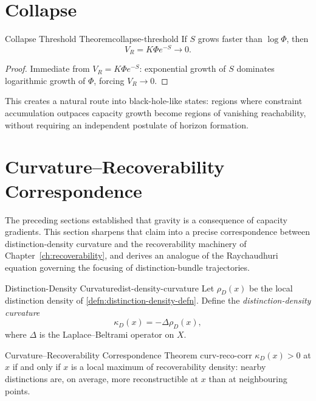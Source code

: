 \documentclass[12pt,twoside,openright]{book}
\begin{document}
\section{Collapse}
\label{sec:ch17-collapse}

\begin{theorem}{Collapse Threshold Theorem}{collapse-threshold}
  If $S$ grows faster than $\log\Phi$, then
  \[
    V_R = K\Phi e^{-S} \to 0.
  \]
\end{theorem}

\begin{proof}
  Immediate from $V_R = K\Phi e^{-S}$: exponential growth
  of $S$ dominates logarithmic growth of $\Phi$, forcing
  $V_R \to 0$.
\end{proof}

This creates a natural route into black-hole-like states:
regions where constraint accumulation outpaces capacity
growth become regions of vanishing reachability, without
requiring an independent postulate of horizon formation.

\section{Curvature--Recoverability Correspondence}
\label{sec:ch17-curv-reco}

The preceding sections established that gravity is a
consequence of capacity gradients. This section sharpens
that claim into a precise correspondence between
distinction-density curvature and the recoverability
machinery of Chapter~\ref{ch:recoverability}, and derives
an analogue of the Raychaudhuri equation governing the
focusing of distinction-bundle trajectories.

\begin{definition}{Distinction-Density Curvature}{dist-density-curvature}
  Let $\rho_D(x)$ be the local distinction density of
  \cref{defn:distinction-density-defn}. Define the
  \emph{distinction-density curvature}
  \[
    \kappa_D(x) = -\Delta\rho_D(x),
  \]
  where $\Delta$ is the Laplace--Beltrami operator on $X$.
\end{definition}

\begin{theorem}{Curvature--Recoverability Correspondence Theorem}%
  {curv-reco-corr}
  $\kappa_D(x) > 0$ at $x$ if and only if $x$ is a local
  maximum of recoverability density: nearby distinctions
  are, on average, more reconstructible at $x$ than at
  neighbouring points.
\end{theorem}
\end{document}
